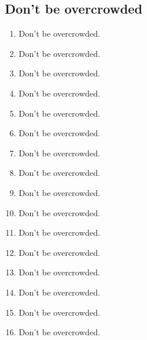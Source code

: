 \documentclass[
        ]{beamer}
\begin{document}
\subsection{Don't be overcrowded}
\begin{frame}[t]{\subsecname} %
    \begin{enumerate}
    \item Don't be overcrowded.
    \item Don't be overcrowded.
    \item Don't be overcrowded.
    \item Don't be overcrowded.
    \item Don't be overcrowded.

    \item Don't be overcrowded.
    \item Don't be overcrowded.
    \item Don't be overcrowded.
    \item Don't be overcrowded.
    \item Don't be overcrowded.
    
    \item Don't be overcrowded.
    \item Don't be overcrowded.
    \item Don't be overcrowded.
    \item Don't be overcrowded.
    \item Don't be overcrowded.
    
    \item Don't be overcrowded.
    \end{enumerate}
\end{frame}
\end{document}
